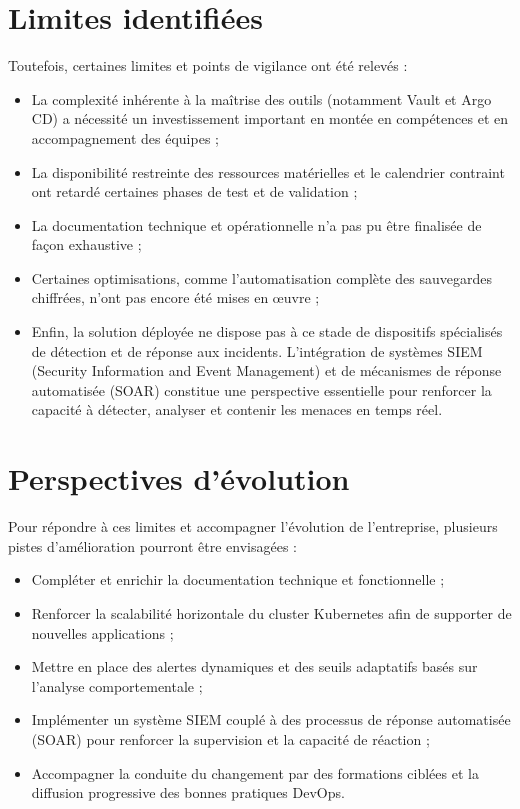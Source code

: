 \section{Limites identifiées}

Toutefois, certaines limites et points de vigilance ont été relevés :
\begin{itemize}
	\item La complexité inhérente à la maîtrise des outils (notamment Vault et Argo CD) a nécessité un investissement important en montée en compétences et en accompagnement des équipes ;
	\item La disponibilité restreinte des ressources matérielles et le calendrier contraint ont retardé certaines phases de test et de validation ;
	\item La documentation technique et opérationnelle n’a pas pu être finalisée de façon exhaustive ;
	\item Certaines optimisations, comme l’automatisation complète des sauvegardes chiffrées, n’ont pas encore été mises en œuvre ;
	\item Enfin, la solution déployée ne dispose pas à ce stade de dispositifs spécialisés de détection et de réponse aux incidents. L’intégration de systèmes SIEM (Security Information and Event Management) et de mécanismes de réponse automatisée (SOAR) constitue une perspective essentielle pour renforcer la capacité à détecter, analyser et contenir les menaces en temps réel.
\end{itemize}

\section{Perspectives d’évolution}

Pour répondre à ces limites et accompagner l’évolution de l’entreprise, plusieurs pistes d’amélioration pourront être envisagées :
\begin{itemize}
	\item Compléter et enrichir la documentation technique et fonctionnelle ;
	\item Renforcer la scalabilité horizontale du cluster Kubernetes afin de supporter de nouvelles applications ;
	\item Mettre en place des alertes dynamiques et des seuils adaptatifs basés sur l’analyse comportementale ;
	\item Implémenter un système SIEM couplé à des processus de réponse automatisée (SOAR) pour renforcer la supervision et la capacité de réaction ;
	\item Accompagner la conduite du changement par des formations ciblées et la diffusion progressive des bonnes pratiques DevOps.
\end{itemize}

